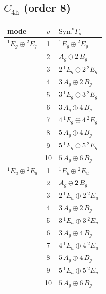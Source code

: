 \documentclass[11pt]{article}
\begin{document}
\subsection*{$C_{4\mathrm{h}}$ \quad (order 8)}
\begin{longtable}{l c p{}}
\hline mode & $v$ & $\mathrm{Sym}^v\Gamma_s$\\ \hline\endhead
${}^{1}E_{g}\oplus {}^{2}E_{g}$ & 1 & ${}^{1}E_{g}\oplus {}^{2}E_{g}$\\
 & 2 & $A_{g}\oplus 2\,B_{g}$\\
 & 3 & $2\,{}^{1}E_{g}\oplus 2\,{}^{2}E_{g}$\\
 & 4 & $3\,A_{g}\oplus 2\,B_{g}$\\
 & 5 & $3\,{}^{1}E_{g}\oplus 3\,{}^{2}E_{g}$\\
 & 6 & $3\,A_{g}\oplus 4\,B_{g}$\\
 & 7 & $4\,{}^{1}E_{g}\oplus 4\,{}^{2}E_{g}$\\
 & 8 & $5\,A_{g}\oplus 4\,B_{g}$\\
 & 9 & $5\,{}^{1}E_{g}\oplus 5\,{}^{2}E_{g}$\\
 & 10 & $5\,A_{g}\oplus 6\,B_{g}$\\
\hline
${}^{1}E_{u}\oplus {}^{2}E_{u}$ & 1 & ${}^{1}E_{u}\oplus {}^{2}E_{u}$\\
 & 2 & $A_{g}\oplus 2\,B_{g}$\\
 & 3 & $2\,{}^{1}E_{u}\oplus 2\,{}^{2}E_{u}$\\
 & 4 & $3\,A_{g}\oplus 2\,B_{g}$\\
 & 5 & $3\,{}^{1}E_{u}\oplus 3\,{}^{2}E_{u}$\\
 & 6 & $3\,A_{g}\oplus 4\,B_{g}$\\
 & 7 & $4\,{}^{1}E_{u}\oplus 4\,{}^{2}E_{u}$\\
 & 8 & $5\,A_{g}\oplus 4\,B_{g}$\\
 & 9 & $5\,{}^{1}E_{u}\oplus 5\,{}^{2}E_{u}$\\
 & 10 & $5\,A_{g}\oplus 6\,B_{g}$\\
\hline
\end{longtable}
\end{document}
